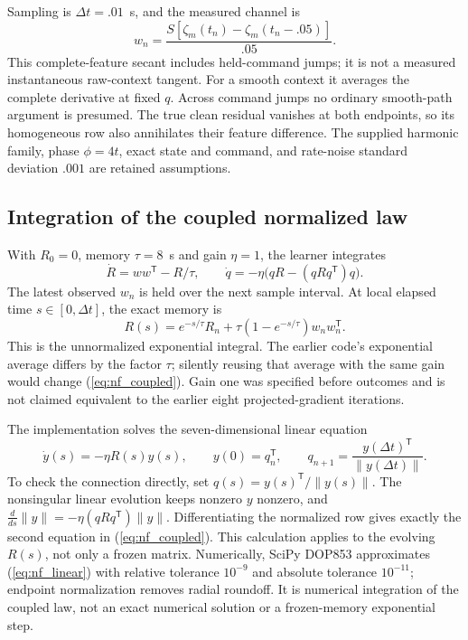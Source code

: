 \documentclass[journal]{IEEEtran}
\begin{document}
Sampling is $\Delta t=.01$~s, and the measured channel is
\begin{equation}
 w_n=\frac{S[\zeta_m(t_n)-\zeta_m(t_n-.05)]}{.05}.
 \label{eq:nf_secant}
\end{equation}
This complete-feature secant includes held-command jumps; it is not a
measured instantaneous raw-context tangent. For a smooth context it averages
the complete derivative at fixed $q$. Across command jumps no ordinary
smooth-path argument is presumed. The true clean residual vanishes at both
endpoints, so its homogeneous row also annihilates their feature difference.
The supplied harmonic family, phase $\phi=4t$, exact state and command,
and rate-noise standard deviation $.001$ are retained assumptions.

\subsection{Integration of the coupled normalized law}
With $R_0=0$, memory $\tau=8$~s and gain $\eta=1$, the learner integrates
\begin{equation}
 \dot R=ww^{\mathsf T}-R/\tau,\qquad
 \dot q=-\eta\bigl(qR-(qRq^{\mathsf T})q\bigr).
 \label{eq:nf_coupled}
\end{equation}
The latest observed $w_n$ is held over the next sample interval. At local
elapsed time $s\in[0,\Delta t]$, the exact memory is
\begin{equation}
 R(s)=e^{-s/\tau}R_n+\tau(1-e^{-s/\tau})w_nw_n^{\mathsf T}.
 \label{eq:nf_memory}
\end{equation}
This is the unnormalized exponential integral. The earlier code's
exponential average differs by the factor $\tau$; silently reusing that
average with the same gain would change (\ref{eq:nf_coupled}).
Gain one was specified before outcomes and is not claimed equivalent to
the earlier eight projected-gradient iterations.

The implementation solves the seven-dimensional linear equation
\begin{equation}
 \dot y(s)=-\eta R(s)y(s),\qquad y(0)=q_n^{\mathsf T},\qquad
 q_{n+1}=\frac{y(\Delta t)^{\mathsf T}}{\|y(\Delta t)\|}.
 \label{eq:nf_linear}
\end{equation}
To check the connection directly, set $q(s)=y(s)^{\mathsf T}/\|y(s)\|$.
The nonsingular linear evolution keeps nonzero $y$ nonzero, and
$\frac{d}{ds}\|y\|=-\eta(qRq^{\mathsf T})\|y\|$.
Differentiating the normalized row gives exactly the second equation in
(\ref{eq:nf_coupled}). This calculation applies to the evolving $R(s)$,
not only a frozen matrix. Numerically, SciPy DOP853 approximates
(\ref{eq:nf_linear}) with relative tolerance $10^{-9}$ and absolute
tolerance $10^{-11}$; endpoint normalization removes radial roundoff.
It is numerical integration of the coupled law, not an exact numerical
solution or a frozen-memory exponential step.
\end{document}
